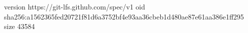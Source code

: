 version https://git-lfs.github.com/spec/v1
oid sha256:a1562365fed20721f81d6a3752bf4e93aa36cbeb1d480ae87e61aa386e1ff295
size 43584
